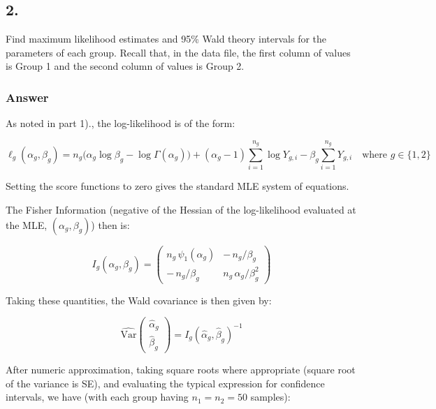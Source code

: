 \documentclass[
]{article}
\begin{document}
\newpage

\subsection{2.}\label{section-1}

Find maximum likelihood estimates and 95\% Wald theory intervals for the
parameters of each group. Recall that, in the data file, the first
column of values is Group 1 and the second column of values is Group 2.

\subsubsection{Answer}\label{answer-1}

As noted in part 1)., the log-likelihood is of the form:

\[
\ell_g(\alpha_g,\beta_g)
= n_g\big(\alpha_g\log\beta_g-\log\Gamma(\alpha_g)\big)
 +(\alpha_g-1)\sum_{i=1}^{n_g}\log Y_{g,i}
 -\beta_g\sum_{i=1}^{n_g}Y_{g,i} \quad \text{where } g \in \{1, 2\}
\]

Setting the score functions to zero gives the standard MLE system of
equations.

The Fisher Information (negative of the Hessian of the log-likelihood
evaluated at the MLE, \((\alpha_g,\beta_g)\)) then is:

\[
I_g(\alpha_g,\beta_g)=
\begin{pmatrix}
n_g\,\psi_{1}(\alpha_g) & -\,n_g/\beta_g\\[4pt]
-\,n_g/\beta_g & n_g\,\alpha_g/\beta_g^2
\end{pmatrix}
\]

Taking these quantities, the Wald covariance is then given by:

\[
\widehat{\mathrm{Var}}\!\begin{pmatrix}\hat\alpha_g\\ \hat\beta_g\end{pmatrix}
= I_g(\hat\alpha_g,\hat\beta_g)^{-1}
\]

After numeric approximation, taking square roots where appropriate
(square root of the variance is SE), and evaluating the typical
expression for confidence intervals, we have (with each group having
\(n_1=n_2=50\) samples):
\end{document}
